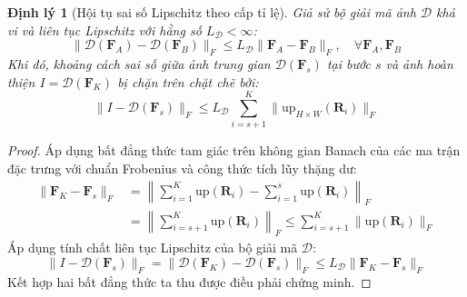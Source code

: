 \documentclass[10pt,twocolumn,letterpaper]{article}
\newtheorem{theorem}{Định lý}
\begin{document}
\begin{theorem}[Hội tụ sai số Lipschitz theo cấp tỉ lệ]
Giả sử bộ giải mã ảnh $\mathcal{D}$ khả vi và liên tục Lipschitz với hằng số $L_{\mathcal{D}} < \infty$:
\begin{equation}
\|\mathcal{D}(\mathbf{F}_A) - \mathcal{D}(\mathbf{F}_B)\|_F \le L_{\mathcal{D}} \|\mathbf{F}_A - \mathbf{F}_B\|_F, \quad \forall \mathbf{F}_A, \mathbf{F}_B
\end{equation}
Khi đó, khoảng cách sai số giữa ảnh trung gian $\mathcal{D}(\mathbf{F}_s)$ tại bước $s$ và ảnh hoàn thiện $I = \mathcal{D}(\mathbf{F}_K)$ bị chặn trên chặt chẽ bởi:
\begin{equation}
\|I - \mathcal{D}(\mathbf{F}_s)\|_F \le L_{\mathcal{D}} \sum_{i=s+1}^{K} \|\text{up}_{H \times W}(\mathbf{R}_i)\|_F
\end{equation}
\end{theorem}
\begin{proof}
Áp dụng bất đẳng thức tam giác trên không gian Banach của các ma trận đặc trưng với chuẩn Frobenius và công thức tích lũy thặng dư:
\begin{align}
\|\mathbf{F}_K - \mathbf{F}_s\|_F &= \left\| \sum_{i=1}^K \text{up}(\mathbf{R}_i) - \sum_{i=1}^s \text{up}(\mathbf{R}_i) \right\|_F \nonumber \\
&= \left\| \sum_{i=s+1}^K \text{up}(\mathbf{R}_i) \right\|_F \le \sum_{i=s+1}^K \|\text{up}(\mathbf{R}_i)\|_F
\end{align}
Áp dụng tính chất liên tục Lipschitz của bộ giải mã $\mathcal{D}$:
\begin{equation}
\|I - \mathcal{D}(\mathbf{F}_s)\|_F = \|\mathcal{D}(\mathbf{F}_K) - \mathcal{D}(\mathbf{F}_s)\|_F \le L_{\mathcal{D}} \|\mathbf{F}_K - \mathbf{F}_s\|_F
\end{equation}
Kết hợp hai bất đẳng thức ta thu được điều phải chứng minh.
\end{proof}
\end{document}
